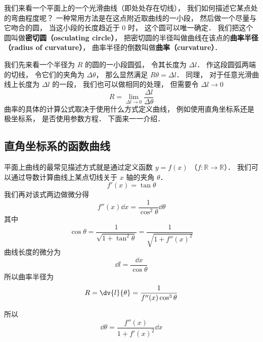 

我们来看一个平面上的一个光滑曲线（即处处存在切线）， 我们如何描述它某点处的弯曲程度呢？ 一种常用方法是在这点附近取曲线的一小段， 然后做一个尽量与它吻合的圆， 当这小段的长度趋近于 0 时， 这个圆可以唯一确定． 我们把这个圆叫做\textbf{密切圆（osculating circle）}， 把密切圆的半径叫做曲线在该点的\textbf{曲率半径（radius of curvature）}， 曲率半径的倒数叫做\textbf{曲率（curvature）}．

我们先来看一个半径为 $R$ 的圆的一小段圆弧， 令其长度为 $\Delta l$． 作这段圆弧两端的切线， 令它们的夹角为 $\Delta \theta$， 那么显然满足 $R \theta = \Delta l$． 同理， 对于任意光滑曲线上长度为 $\Delta l$ 的一段， 我们也可以做相同的处理， 但需要令 $\Delta l \to 0$
\begin{equation}
R = \lim_{\Delta l \to 0} \frac{\Delta l}{\Delta \theta}
\end{equation}
曲率的具体的计算公式取决于使用什么方式定义曲线， 例如使用直角坐标系还是极坐标系， 是否使用参数方程． 下面来一一介绍．

\subsection{直角坐标系的函数曲线}

平面上曲线的最常见描述方式就是通过定义函数 $y = f(x)$ （$f:\mathbb R \to \mathbb R$）． 我们可以通过导数计算曲线上某点切线关于 $x$ 轴的夹角 $\theta$．
\begin{equation}
f'(x) = \tan \theta
\end{equation}
我们再对该式两边做微分得
\begin{equation}
f''(x) \dd{x} = \frac{1}{\cos^2\theta} \dd{\theta}
\end{equation}
其中
\begin{equation}
\cos\theta = \frac{1}{\sqrt{1 + \tan^2\theta}} = \frac{1}{\sqrt{1 + f''(x)^2}}
\end{equation}
曲线长度的微分为
\begin{equation}
\dd{l} = \frac{\dd{x}}{\cos\theta}
\end{equation}
所以曲率半径为
\begin{equation}
R = \dv{l}{\theta} = \frac{1}{f''(x)\cos^3\theta}
\end{equation}


所以
\begin{equation}
\dd{\theta} = \frac{f''(x)}{1 + f'(x)^2}\dd{x}
\end{equation}

